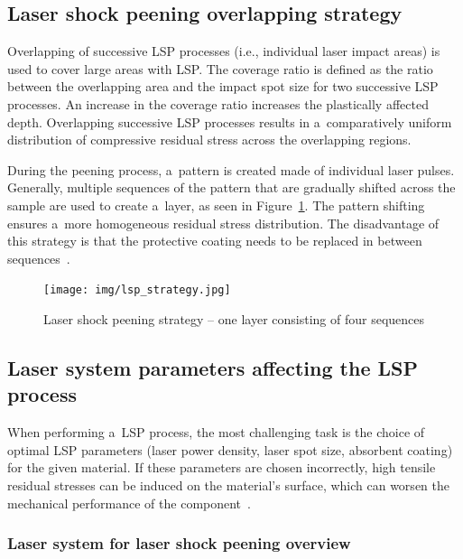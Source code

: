 \subsection{Laser shock peening overlapping strategy}

Overlapping of successive LSP processes (i.e., individual laser impact areas) is used to cover large areas with LSP. The coverage ratio is defined as the ratio between the overlapping area and the impact spot size for two successive LSP processes. An increase in the coverage ratio increases the plastically affected depth. Overlapping successive LSP processes results in a~comparatively uniform distribution of compressive residual stress across the overlapping regions.

During the peening process, a~pattern is created made of individual laser pulses. Generally, multiple sequences of the pattern that are gradually shifted across the sample are used to create a~layer, as seen in Figure~\ref{fig:lspstrategy}. The pattern shifting ensures a~more homogeneous residual stress distribution. The disadvantage of this strategy is that the protective coating needs to be replaced in between sequences~\cite{kaufman}.

\begin{figure}[h]
    \centering
    \texttt{[image: img/lsp\_strategy.jpg]}
    \caption[Laser shock peening strategy -- one layer consisting of four sequences]{Laser shock peening strategy -- one layer consisting of four sequences \protect\cite{bohm_kaufman_brajer_rostohar_2019}}
    \label{fig:lspstrategy}
\end{figure}



\subsection{Laser system parameters affecting the LSP process}

When performing a~LSP process, the most challenging task is the choice of optimal LSP parameters (laser power density, laser spot size, absorbent coating) for the given material. If these parameters are chosen incorrectly, high tensile residual stresses can be induced on the material's surface, which can worsen the mechanical performance of the component~\cite{clauer_holbrook_fairand_1981}.  

\subsubsection*{Laser system for laser shock peening overview}


